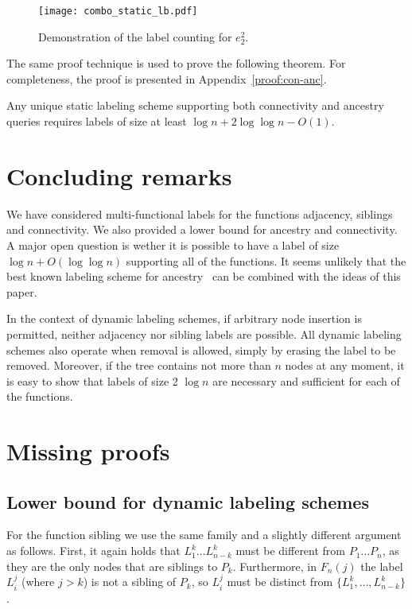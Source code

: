 \documentclass{llncs}
\begin{document}
\vspace{-7ex}
\begin{figure}[htbp]
    \centering
    \texttt{[image: combo\_static\_lb.pdf]}
    \caption{Demonstration of the label counting for $e_2^2$.}
    \label{fig:combo_static_lb}
\end{figure}

The same proof technique is used to prove the following theorem. For completeness, the proof is presented in Appendix~\ref{proof:con-anc}.
\begin{theorem}\label{thm:con-anc}
Any unique static labeling scheme supporting both connectivity and ancestry queries
requires labels of size at least $\log n + 2\log\log n - O(1)$.
\end{theorem}
\section{Concluding remarks}
We have considered multi-functional labels for the functions adjacency, siblings and connectivity.
We also provided a lower bound for ancestry and connectivity.
A major open question is wether it is possible to have a label of size $\log n +O (\log \log n)$ supporting all of the functions.
It seems unlikely that the best known labeling scheme for ancestry~\cite{Korman10} can be combined with the ideas of this paper.

In the context of dynamic labeling schemes, if arbitrary node insertion is permitted, neither adjacency nor sibling labels are  possible. All dynamic labeling schemes also operate when removal is allowed, simply by erasing the label to be removed. Moreover, if the tree contains  not more than $n$ nodes at any moment, it is easy to show that labels of size  2 $\log n$  are necessary and sufficient for each of the  functions.
  
  
\appendix
\section{Missing proofs}
\subsection{Lower bound for  dynamic labeling schemes}\label{lower-simple}
For the function sibling we use  the same family and a slightly different argument as follows.
First, it again holds that  $L_1^{k}\dots L_{n-k}^{k}$ must be different from
$P_1\dots P_n$, as they are the  only nodes that are siblings to $P_{k}$.
Furthermore, in $F_n(j)$ the label $L_i^j$ (where $j>k$) is not a sibling of
$P_{k}$, so $L_i^j$ must be distinct from $\{L_1^{k}, \dots, L_{n-k}^{k}\}$.
\end{document}
